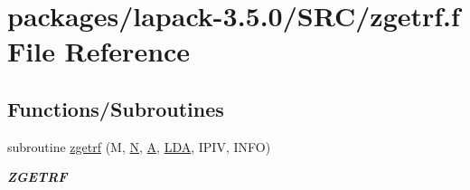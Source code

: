 \hypertarget{zgetrf_8f}{}\section{packages/lapack-\/3.5.0/\+S\+R\+C/zgetrf.f File Reference}
\label{zgetrf_8f}
\subsection*{Functions/\+Subroutines}
\begin{DoxyCompactItemize}
\item 
subroutine \hyperlink{group__complex16GEcomputational_ga5b625680e6251feb29e386193914981c}{zgetrf} (M, \hyperlink{polmisc_8c_a0240ac851181b84ac374872dc5434ee4}{N}, \hyperlink{classA}{A}, \hyperlink{example__user_8c_ae946da542ce0db94dced19b2ecefd1aa}{L\+D\+A}, I\+P\+I\+V, I\+N\+F\+O)
\begin{DoxyCompactList}\small\item\em {\bfseries Z\+G\+E\+T\+R\+F} \end{DoxyCompactList}\end{DoxyCompactItemize}
